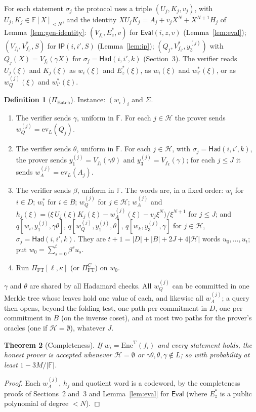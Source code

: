 \documentclass[11pt]{article}
\newtheorem{theorem}{Theorem}
\theoremstyle{definition}
\newtheorem{definition}[theorem]{Definition}
\newcommand{\F}{\mathbb{F}}
\newcommand{\ev}{\mathrm{ev}}
\begin{document}
For each statement $\sigma_j$ the protocol uses a triple $(U_j,K_j,v_j)$, with $U_j,K_j\in\F[X]_{<N}$, and the identity $XU_jK_j=A_j+v_jX^N+X^{N+1}H_j$ of Lemma~\ref{lem:gen-identity}:
$(V_{f_i},E^\ast_z,v)$ for $\mathsf{Eval}(i,z,v)$ (Lemma~\ref{lem:eval});
$(V_{f_i},V_{f_{i'}}^\ast,S)$ for $\mathsf{IP}(i,i',S)$ (Lemma~\ref{lem:ip});
$(Q_j,V_{f_{i'}}^\ast,y_3^{(j)})$ with $Q_j(X)=V_{f_i}(\gamma X)$ for $\sigma_j=\mathsf{Had}(i,i',k)$ (Section~3).
The verifier reads $U_j(\xi)$ and $K_j(\xi)$ as $w_i(\xi)$ and $E^\ast_z(\xi)$, as $w_i(\xi)$ and $w_{i'}^\ast(\xi)$, or as $w_Q^{(j)}(\xi)$ and $w_{i'}^\ast(\xi)$.

\begin{definition}[$\Pi_{\mathrm{Batch}}$]
Instance: $(w_i)_i$ and $\Sigma$.
\begin{enumerate}[nosep]
\item The verifier sends $\gamma$, uniform in $\F$. For each $j\in\mathcal H$ the prover sends $w_Q^{(j)}=\ev_L(Q_j)$.
\item The verifier sends $\theta$, uniform in $\F$. For each $j\in\mathcal H$, with $\sigma_j=\mathsf{Had}(i,i',k)$, the prover sends $y_1^{(j)}=V_{f_i}(\gamma\theta)$ and $y_3^{(j)}=V_{f_k}(\gamma)$; for each $j\le J$ it sends $w_A^{(j)}=\ev_L(A_j)$.
\item The verifier sends $\beta$, uniform in $\F$. The words are, in a fixed order: $w_i$ for $i\in D$; $w_i^\ast$ for $i\in B$; $w_Q^{(j)}$ for $j\in\mathcal H$; $w_A^{(j)}$ and $h_j(\xi)=\bigl(\xi\,U_j(\xi)K_j(\xi)-w_A^{(j)}(\xi)-v_j\xi^N\bigr)/\xi^{N+1}$ for $j\le J$; and $q[w_i,y_1^{(j)},\gamma\theta]$, $q[w_Q^{(j)},y_1^{(j)},\theta]$, $q[w_k,y_3^{(j)},\gamma]$ for $j\in\mathcal H$, $\sigma_j=\mathsf{Had}(i,i',k)$.
They are $t+1=|D|+|B|+2J+4|\mathcal H|$ words $u_0,\dots,u_t$; put $w_0=\sum_{s=0}^t\beta^su_s$.
\item Run $\Pi_{\mathrm{FT}}[\ell,\kappa]$ (or $\Pi^C_{\mathrm{FT}}$) on $w_0$.
\end{enumerate}
\end{definition}
$\gamma$ and $\theta$ are shared by all Hadamard checks. All $w_Q^{(j)}$ can be committed in one Merkle tree whose leaves hold one value of each, and likewise all $w_A^{(j)}$; a query then opens, beyond the folding test, one path per commitment in $D$, one per commitment in $B$ (on the inverse coset), and at most two paths for the prover's oracles (one if $\mathcal H=\emptyset$), whatever $J$.

\begin{theorem}[Completeness]
If $w_i=\mathrm{Enc}^{\mathrm T}(f_i)$ and every statement holds, the honest prover is accepted whenever $\mathcal H=\emptyset$ or $\gamma\theta,\theta,\gamma\notin L$; so with probability at least $1-3M/|\F|$.
\end{theorem}
\begin{proof}
Each $w_A^{(j)}$, $h_j$ and quotient word is a codeword, by the completeness proofs of Sections~2 and~3 and Lemma~\ref{lem:eval} for $\mathsf{Eval}$ (where $E^\ast_z$ is a public polynomial of degree $<N$).
\end{proof}
\end{document}
